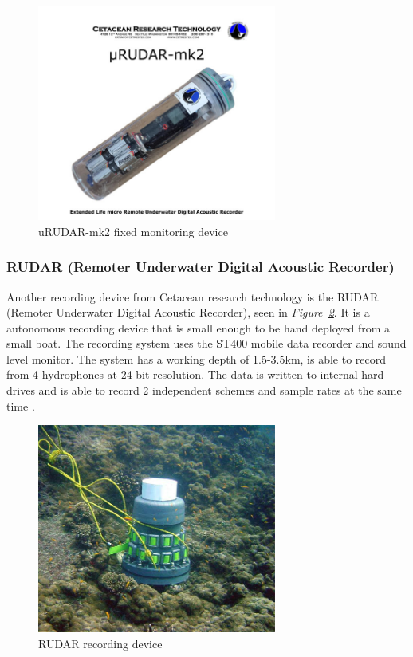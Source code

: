 \begin{figure}[h]
    \centering
    \includegraphics[width=0.70\textwidth]{graphics/uRUDAR-mk2.jpg}
    \caption{uRUDAR-mk2 fixed monitoring device\cite{computing_microrudar_nodate}}
    \label{fig:uRUDAR}
\end{figure}

\subsubsection{RUDAR (Remoter Underwater Digital Acoustic Recorder)}
Another recording device from Cetacean research technology is the RUDAR (Remoter Underwater Digital Acoustic Recorder), seen in \textit{Figure~\ref{fig:Rudar}}. 
It is a autonomous recording device that is small enough to be hand deployed from a small boat.
The recording system uses the ST400 mobile data recorder and sound level monitor. 
The system has a working depth of 1.5-3.5km, is able to record from 4 hydrophones at 24-bit resolution.
The data is written to internal hard drives and is able to record 2 independent schemes and sample rates at the same time \cite{cetacean_research_technology_rudar_2021}.

\begin{figure}[h]
    \centering
    \includegraphics[width=0.70\textwidth]{graphics/Rudar.jpg}
    \caption{RUDAR recording device \cite{cetacean_research_technology_rudar_2021}}
    \label{fig:Rudar}
\end{figure}

